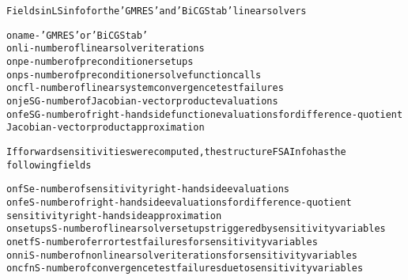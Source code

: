 \begin{alltt}
  Fields in LSinfo for the 'GMRES' and 'BiCGStab' linear solvers

o name  - 'GMRES' or 'BiCGStab'
o nli   - number of linear solver iterations
o npe   - number of preconditioner setups
o nps   - number of preconditioner solve function calls
o ncfl  - number of linear system convergence test failures
o njeSG - number of Jacobian-vector product evaluations
o nfeSG - number of right-hand side function evaluations for difference-quotient
          Jacobian-vector product approximation

If forward sensitivities were computed, the structure FSAInfo has the 
following fields

o nfSe      - number of sensitivity right-hand side evaluations
o nfeS      - number of right-hand side evaluations for difference-quotient
              sensitivity right-hand side approximation
o nsetupsS  - number of linear solver setups triggered by sensitivity variables
o netfS     - number of error test failures for sensitivity variables
o nniS      - number of nonlinear solver iterations for sensitivity variables
o ncfnS     - number of convergence test failures due to sensitivity variables
\end{alltt}






\vspace{0.1in}